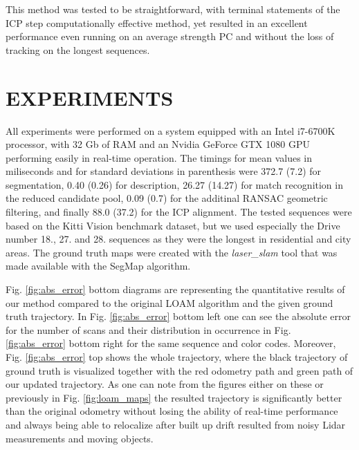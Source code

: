 \documentclass[letterpaper, 10 pt, conference]{ieeeconf}  %
\begin{document}
This method was tested to be straightforward, with terminal statements of the ICP step computationally effective method, yet resulted in an excellent performance even running on an average strength PC and without the loss of tracking on the longest sequences. 

\section{EXPERIMENTS} \label{experiments}

All experiments were performed on a system equipped with
an Intel i7-6700K processor, with 32 Gb of RAM and an Nvidia GeForce GTX 1080 GPU performing easily in real-time operation. 
The timings for mean values in miliseconds and for standard deviations in parenthesis were 372.7 (7.2) for segmentation, 0.40 (0.26) for description, 26.27 (14.27) for match recognition in the reduced candidate pool, 0.09 (0.7) for the additinal RANSAC geometric filtering, and finally 88.0 (37.2) for the ICP alignment. The tested sequences were based on the Kitti Vision benchmark dataset, but we used especially the Drive number 18., 27. and 28. sequences as they were the longest in residential and city areas. The ground truth maps were created with the \textit{laser\_slam} tool that was made available with the SegMap algorithm. 

Fig. \ref{fig:abs_error} bottom diagrams are representing the quantitative results of our method compared to the original LOAM algorithm and the given ground truth trajectory. In Fig. \ref{fig:abs_error} bottom left one can see the absolute error for the number of scans and their distribution in occurrence in Fig. \ref{fig:abs_error} bottom right for the same sequence and color codes. Moreover, Fig. \ref{fig:abs_error} top shows the whole trajectory, where the black trajectory of ground truth is visualized together with the red odometry path and green path of our updated trajectory. As one can note from the figures either on these or previously in Fig. \ref{fig:loam_maps} the resulted trajectory is significantly better than the original odometry without losing the ability of real-time performance and always being able to relocalize after built up drift resulted from noisy Lidar measurements and moving objects. 
\end{document}
